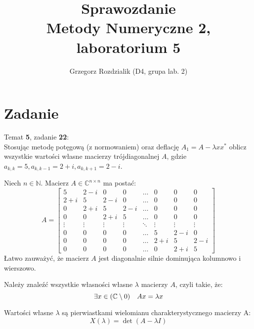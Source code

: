 \documentclass[12pt]{article}
\begin{document}
	\title{Sprawozdanie\\Metody Numeryczne 2, laboratorium 5}
	\author{Grzegorz Rozdzialik (D4, grupa lab. 2)}
	\maketitle	
	
	\section{Zadanie}
	{\Large Temat \textbf{5}, zadanie \textbf{22}:}\\
	Stosując metodę potęgową (z normowaniem) oraz deflację $A_1 = A - \lambda x x^*$ oblicz wszystkie wartości własne macierzy trójdiagonalnej $A$, gdzie $a_{k,k} = 5, a_{k, k - 1} = 2+i, a_{k, k+1} = 2-i$.
	
	Niech $n \in \mathbb{N}$. Macierz $A \in \mathbb{C}^{n \times n}$ ma postać:
	\begin{equation*}
		A =
		\begin{bmatrix}
			5      & 2 - i  & 0      & 0      & \dots  & 0      & 0      & 0      \\
			2+i    & 5      & 2-i    & 0      & \dots  & 0      & 0      & 0      \\
			0      & 2+i    & 5      & 2-i    & \dots  & 0      & 0      & 0      \\
			0      & 0      & 2+i    & 5      & \dots  & 0      & 0      & 0      \\
			\vdots & \vdots & \vdots & \vdots & \ddots & \vdots & \vdots & \vdots \\
			0      & 0      & 0      & 0      & \dots  & 5      & 2-i    & 0      \\
			0      & 0      & 0      & 0      & \dots  & 2+i    & 5      & 2-i    \\
			0      & 0      & 0      & 0      & \dots  & 0      & 2+i    & 5
		\end{bmatrix}
	\end{equation*}
	Łatwo zauważyć, że macierz $A$ jest diagonalnie silnie dominująca kolumnowo i wierszowo.
	
	Należy znaleźć wszystkie własności własne $\lambda$ macierzy $A$, czyli takie, że:
	$$\exists x \in (\mathbb{C} \setminus 0) \hspace{10px}  Ax = \lambda x$$
	
	Wartości własne $\lambda$ są pierwiastkami wielomianu charakterystycznego macierzy A:
	$$X(\lambda) = \det (A - \lambda I)$$
	
\end{document}
